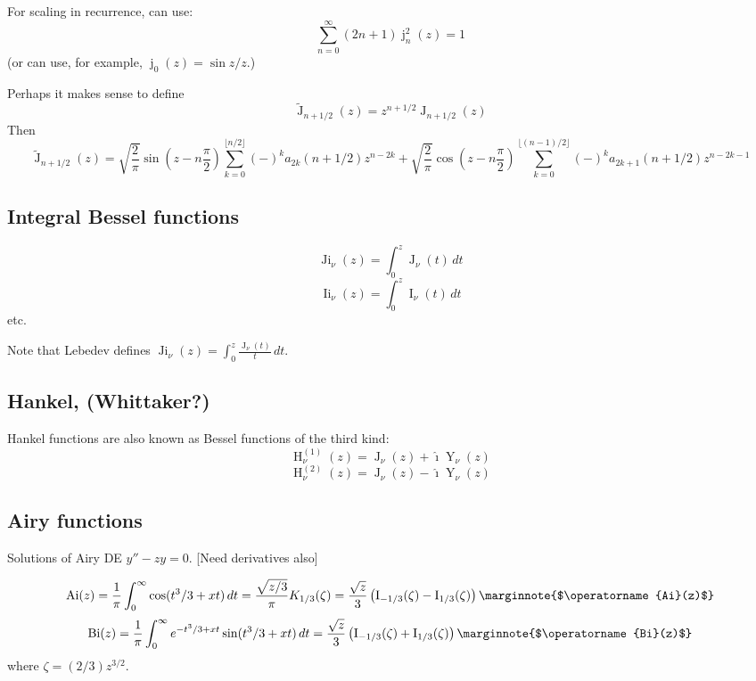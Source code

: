\documentclass[10pt,dvipdfmx,letterpaper,twoside]{article}
\let\O=\operatorname
\newcommand{\ii}{{\hat{\imath}}}
\let\DEF=\marginnote
\begin{document}
For scaling in recurrence, can use:
\[ \sum_{n=0}^\infty (2n+1)\O{j}_n^2(z) = 1 \]
(or can use, for example, $\O{j}_0(z)=\sin z / z$.)

Perhaps it makes sense to define
\[ \widetilde{\O{J}}_{n+1/2}(z) = z^{n+1/2} \O{J}_{n+1/2}(z) \]
Then
\[ \widetilde{\O{J}}_{n+1/2}(z) = \sqrt{\frac2\pi}\sin(z-n\frac{\pi}{2})\sum_{k=0}^{\lfloor n/2 \rfloor}(-)^k a_{2k}(n+1/2)z^{n-2k}
            + \sqrt{\frac2\pi}\cos(z-n\frac{\pi}{2})\sum_{k=0}^{\lfloor(n-1)/2\rfloor}(-)^k a_{2k+1}(n+1/2)z^{n-2k-1} \]

\subsection{Integral Bessel functions}

\[ \O{Ji}_\nu(z) = \int_0^z \O{J}_\nu(t)\,dt \]
\[ \O{Ii}_\nu(z) = \int_0^z \O{I}_\nu(t)\,dt \]
etc.

Note that Lebedev defines $\O{Ji}_\nu(z) = \int_0^z\frac{\O{J}_\nu(t)}{t}\,dt$.

\subsection{Hankel, (Whittaker?)}

Hankel functions are also known as Bessel functions of the third kind:
\[ \O{H}^{(1)}_\nu(z) = \O{J}_\nu(z) + \ii\O{Y}_\nu(z) \]
\[ \O{H}^{(2)}_\nu(z) = \O{J}_\nu(z) - \ii\O{Y}_\nu(z) \]

\subsection{Airy functions}
Solutions of Airy DE $y'' - z y = 0$.
[Need derivatives also]

\[ \O{Ai}(z) = \frac1\pi \int_0^\infty \cos(t^3/3 + xt)\,dt
  = \frac{\sqrt{z/3}}{\pi}K_{1/3}(\zeta)
  = \frac{\sqrt{z}}{3}\left( \O{I}_{-1/3}(\zeta) - \O{I}_{1/3}(\zeta) \right)
  \DEF{$\O{Ai}(z)$} \]
\[ \O{Bi}(z) = \frac1\pi \int_0^\infty e^{-t^3/3 + xt}\sin(t^3/3 + xt)\,dt
  = \frac{\sqrt{z}}{3}\left( \O{I}_{-1/3}(\zeta) + \O{I}_{1/3}(\zeta) \right)
  \DEF{$\O{Bi}(z)$} \]
where $\zeta = (2/3)z^{3/2}$.
\end{document}

